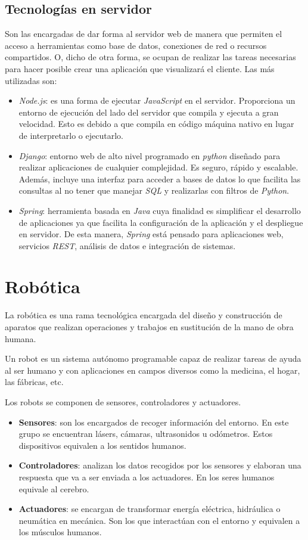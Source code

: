 \subsection{Tecnologías en servidor}
\label{subsec:tecserver}
Son las encargadas de dar forma al servidor web de manera que permiten el acceso a herramientas como base de datos, conexiones de red o recursos compartidos. O, dicho de otra forma, se ocupan de realizar las tareas necesarias para hacer posible crear una aplicación que visualizará el cliente. Las más utilizadas son:
\begin{itemize}
    \item \textit{Node.js}: es una forma de ejecutar \textit{JavaScript} en el servidor. Proporciona un entorno de ejecución del lado del servidor que compila y ejecuta a gran velocidad. Esto es debido a que compila en código máquina nativo en lugar de interpretarlo o ejecutarlo.
    \item \textit{Django}: entorno web de alto nivel programado en \textit{python} diseñado para realizar aplicaciones de cualquier complejidad. Es seguro, rápido y escalable. Además, incluye una interfaz para acceder a bases de datos lo que facilita las consultas al no tener que manejar \textit{SQL} y realizarlas con filtros de \textit{Python}.
    \item \textit{Spring}: herramienta basada en \textit{Java} cuya finalidad es simplificar el desarrollo de aplicaciones ya que facilita la configuración de la aplicación y el despliegue en servidor. De esta manera, \textit{Spring} está pensado para aplicaciones web, servicios \textit{REST}, análisis de datos e integración de sistemas.
\end{itemize}

\section{Robótica}
\label{sec:robotica}
La robótica es una rama tecnológica encargada del diseño y construcción de aparatos que realizan operaciones y trabajos en sustitución de la mano de obra humana.

Un robot es un sistema autónomo programable capaz de realizar tareas de ayuda al ser humano y con aplicaciones en campos diversos como la medicina, el hogar, las fábricas, etc.

Los robots se componen de sensores, controladores y actuadores.
\begin{itemize}
    \item \textbf{Sensores}: son los encargados de recoger información del entorno. En este grupo se encuentran lásers, cámaras, ultrasonidos u odómetros. Estos dispositivos equivalen a los sentidos humanos.
    \item \textbf{Controladores}: analizan los datos recogidos por los sensores y elaboran una respuesta que va a ser enviada a los actuadores. En los seres humanos equivale al cerebro.
    \item \textbf{Actuadores}: se encargan de transformar energía eléctrica, hidráulica o neumática en mecánica. Son los que interactúan con el entorno y equivalen a los músculos humanos.
\end{itemize}

